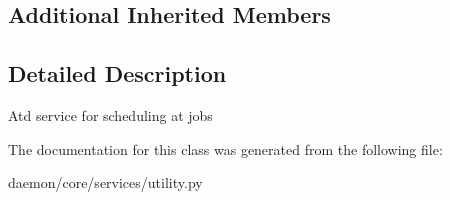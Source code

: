 \subsection*{Additional Inherited Members}


\subsection{Detailed Description}
\begin{DoxyVerb}Atd service for scheduling at jobs
\end{DoxyVerb}
 

The documentation for this class was generated from the following file\+:\begin{DoxyCompactItemize}
\item 
daemon/core/services/utility.\+py\end{DoxyCompactItemize}
